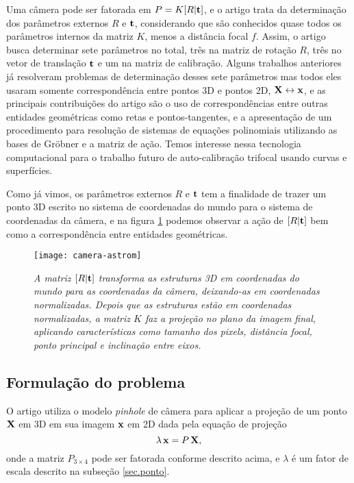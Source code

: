 Uma câmera pode ser fatorada em $P=K[R|{\bf t}]$, e o artigo \citep{bib:kuang} trata da determinação dos parâmetros externos $R$ e ${\bf t}$, considerando que são conhecidos quase todos os parâmetros internos da matriz $K$, menos a distância focal $f$. Assim, o artigo busca determinar sete parâmetros no total, três na matriz de rotação $R$, três no vetor de translação ${\bf t}$ e um na matriz de calibração. Alguns trabalhos anteriores já resolveram problemas de determinação desses sete parâmetros mas todos eles usaram somente correspondência entre pontos 3D e pontos 2D, $\mathbf{X}\leftrightarrow\mathbf{x}$, e as principais contribuições do artigo são o uso de correspondências entre outras entidades geométricas como retas e pontos-tangentes, e a apresentação de um procedimento para resolução de sistemas de equações polinomiais utilizando as bases de Gr\"obner e a matriz de ação. Temos interesse nessa tecnologia computacional para o trabalho futuro de auto-calibração trifocal usando curvas e superfícies. 

Como já vimos, os parâmetros externos $R$ e ${\bf t}$ tem a finalidade de trazer um ponto 3D escrito no sistema de coordenadas do mundo para o sistema de coordenadas da câmera, e na figura \ref{fig.camera-astrom} podemos observar a ação de $[R|{\bf t}]$ bem como a correspondência entre entidades geométricas.

\begin{figure}[!htb]
\centering
\texttt{[image: camera-astrom]}
\caption{{\it A matriz $[R|{\bf t}]$ transforma as estruturas 3D em coordenadas do mundo para as coordenadas da câmera, deixando-as em coordenadas normalizadas. Depois que as estruturas estão em coordenadas normalizadas, a matriz $K$ faz a projeção no plano da imagem final, aplicando características como tamanho dos pixels, distância focal, ponto principal e inclinação entre eixos.}}
\label{fig.camera-astrom}
\end{figure}

\subsection{Formulação do problema}

O artigo utiliza o modelo {\it pinhole} de câmera para aplicar a projeção de um ponto $\mathbf{X}$ em 3D em sua imagem $\mathbf{x}$ em 2D dada pela equação de projeção
\begin{equation}\label{eq.projecao}
\lambda\,\mathbf{x}=P\,\mathbf{X},
\end{equation}
onde a matriz $P_{3\times4}$ pode ser fatorada conforme descrito acima, e $\lambda$ é um fator de escala descrito na subseção \ref{sec.ponto}. 

